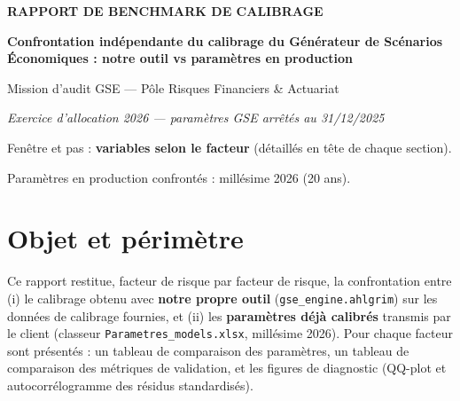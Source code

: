 \documentclass[11pt,a4paper]{article}
\begin{document}
\begin{titlepage}
  \thispagestyle{empty}
  \vspace*{2.0cm}
  {\large\bfseries\color{nexred} RAPPORT DE BENCHMARK DE CALIBRAGE\par}
  \vspace{0.4cm}
  {\Huge\bfseries\color{nexnavy}
   Confrontation ind\'ependante du calibrage du G\'en\'erateur de Sc\'enarios
   \'Economiques : notre outil vs param\`etres en production\par}
  \vspace{0.6cm}
  {\large\color{nexgrey} Mission d'audit GSE --- P\^ole Risques Financiers \& Actuariat\par}
  \vspace{0.4cm}
  {\normalsize\color{nexnavy}\itshape Exercice d'allocation 2026 --- param\`etres GSE arr\^et\'es au 31/12/2025\par}
  \vspace{0.5cm}
  Fen\^etre et pas : \textbf{variables selon le facteur} (d\'etaill\'es en t\^ete de chaque section).\par
  Param\`etres en production confront\'es : millésime 2026 (20 ans).\par
  \vfill
\end{titlepage}
\tableofcontents
\clearpage

\section{Objet et p\'erim\`etre}
Ce rapport restitue, facteur de risque par facteur de risque, la confrontation
entre (i) le calibrage obtenu avec \textbf{notre propre outil}
(\texttt{gse\_engine.ahlgrim}) sur les donn\'ees de calibrage fournies, et (ii)
les \textbf{param\`etres d\'ej\`a calibr\'es} transmis par le client (classeur
\texttt{Parametres\_models.xlsx}, mill\'esime 2026). Pour
chaque facteur sont pr\'esent\'es : un tableau de comparaison des param\`etres,
un tableau de comparaison des m\'etriques de validation, et les figures de
diagnostic (QQ-plot et autocorr\'elogramme des r\'esidus standardis\'es).
\end{document}
